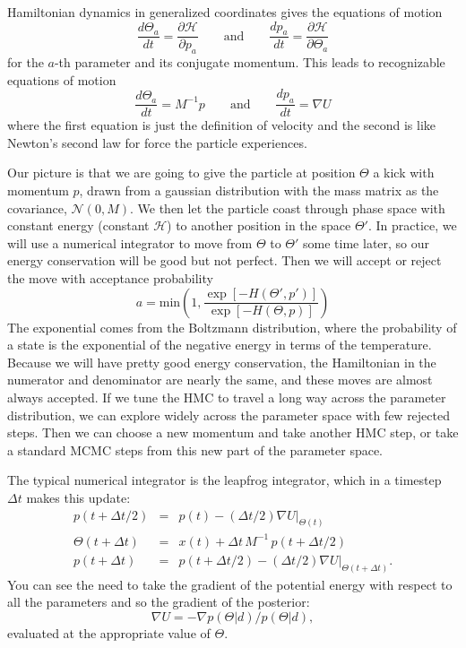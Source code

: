 Hamiltonian dynamics in generalized coordinates gives the equations of motion
\begin{equation}
  \frac{d\Theta_a}{dt} = \frac{\partial \mathcal{H}}{\partial p_a} \qquad\mbox{and}\qquad
  \frac{dp_a}{dt} = \frac{\partial \mathcal{H}}{\partial \Theta_a}
\end{equation}
for the $a$-th parameter and its conjugate momentum.  This leads to recognizable equations of motion
\begin{equation}
  \frac{d\Theta_a}{dt} = M^{-1} p \qquad\mbox{and}\qquad
  \frac{dp_a}{dt} = \nabla U
\end{equation}
where the first equation is just the definition of velocity and the second is like Newton's second law for force the particle experiences.

Our picture is that we are going to give the particle at position $\Theta$ a kick with momentum $p$, drawn from a gaussian distribution with the mass matrix as the covariance, $\mathcal{N}(0,M)$.  We then let the particle coast through phase space with constant energy (constant $\mathcal{H}$) to another position in the space $\Theta'$.  In practice, we will use a numerical integrator to move from $\Theta$ to  $\Theta'$ some time later, so our energy conservation will be good but not perfect.  Then we will accept or reject the move with acceptance probability
\begin{equation}
  a  = \mathrm{min} \left( 1, \frac{\exp[ - H(\Theta',p')] }{\exp[ - H(\Theta,p)]} \right)
\end{equation}
The exponential comes from the Boltzmann distribution, where the probability of a state is the exponential of the negative energy in terms of the temperature.  Because we will have pretty good energy conservation, the Hamiltonian in the numerator and denominator are nearly the same, and these moves are almost always accepted.  If we tune the HMC to travel a long way across the parameter distribution, we can explore widely across the parameter space with few rejected steps.  Then we can choose a new momentum and take another HMC step, or take a standard MCMC steps from this new part of the parameter space.

The typical numerical integrator is the leapfrog integrator, which in a timestep $\Delta t$ makes this update:
\begin{eqnarray}
  p(t + \Delta t/2) &=&  p(t) - (\Delta t / 2) \nabla U |_{\Theta(t)} \\ \nonumber
  \Theta(t + \Delta t) &=& x(t) + \Delta t \, M^{-1}\, p(t + \Delta t/2) \\ \nonumber
  p(t + \Delta t) &=& p(t + \Delta t/2)  - (\Delta t / 2) \nabla U |_{\Theta(t+\Delta t)}.
\end{eqnarray}
You can see the need to take the gradient of the potential energy with respect to all the parameters and so the gradient of the posterior:
\begin{equation}
  \nabla U = - {\nabla p(\Theta|d)/p(\Theta|d)},
\end{equation}
evaluated at the appropriate value of $\Theta$.  %

